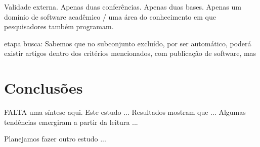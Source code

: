 Validade externa. Apenas duas conferências. Apenas duas bases. Apenas um domínio de software acadêmico / uma área do conhecimento em que pesquisadores também programam.

etapa busca: Sabemos que no subconjunto excluído, por ser automático, poderá existir artigos
dentro dos critérios mencionados, com publicação de software, mas 

\section{Conclusões} \label{estudo1:conclusoes}

FALTA uma síntese aqui. 
Este estudo ...
Resultados mostram que ...
Algumas tendências emergiram a partir da leitura ...

Planejamos fazer outro estudo ... 





